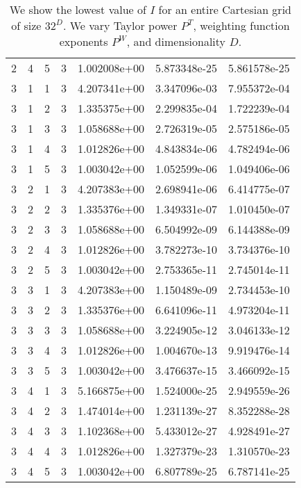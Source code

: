 \documentclass{article}
\begin{document}
\begin{small}
\begin{table}
\begin{center}
\begin{tabular}{|cccc|ccc|}
2 & 4 & 5 & 3 & 1.002008e+00 & 5.873348e-25 & 5.861578e-25 \\ 
3 & 1 & 1 & 3 & 4.207341e+00 & 3.347096e-03 & 7.955372e-04 \\ 
3 & 1 & 2 & 3 & 1.335375e+00 & 2.299835e-04 & 1.722239e-04 \\ 
3 & 1 & 3 & 3 & 1.058688e+00 & 2.726319e-05 & 2.575186e-05 \\ 
3 & 1 & 4 & 3 & 1.012826e+00 & 4.843834e-06 & 4.782494e-06 \\ 
3 & 1 & 5 & 3 & 1.003042e+00 & 1.052599e-06 & 1.049406e-06 \\ 
3 & 2 & 1 & 3 & 4.207383e+00 & 2.698941e-06 & 6.414775e-07 \\ 
3 & 2 & 2 & 3 & 1.335376e+00 & 1.349331e-07 & 1.010450e-07 \\ 
3 & 2 & 3 & 3 & 1.058688e+00 & 6.504992e-09 & 6.144388e-09 \\ 
3 & 2 & 4 & 3 & 1.012826e+00 & 3.782273e-10 & 3.734376e-10 \\ 
3 & 2 & 5 & 3 & 1.003042e+00 & 2.753365e-11 & 2.745014e-11 \\ 
3 & 3 & 1 & 3 & 4.207383e+00 & 1.150489e-09 & 2.734453e-10 \\ 
3 & 3 & 2 & 3 & 1.335376e+00 & 6.641096e-11 & 4.973204e-11 \\ 
3 & 3 & 3 & 3 & 1.058688e+00 & 3.224905e-12 & 3.046133e-12 \\ 
3 & 3 & 4 & 3 & 1.012826e+00 & 1.004670e-13 & 9.919476e-14 \\ 
3 & 3 & 5 & 3 & 1.003042e+00 & 3.476637e-15 & 3.466092e-15 \\ 
3 & 4 & 1 & 3 & 5.166875e+00 & 1.524000e-25 & 2.949559e-26 \\ 
3 & 4 & 2 & 3 & 1.474014e+00 & 1.231139e-27 & 8.352288e-28 \\ 
3 & 4 & 3 & 3 & 1.102368e+00 & 5.433012e-27 & 4.928491e-27 \\ 
3 & 4 & 4 & 3 & 1.012826e+00 & 1.327379e-23 & 1.310570e-23 \\ 
3 & 4 & 5 & 3 & 1.003042e+00 & 6.807789e-25 & 6.787141e-25 \\
\hline
\end{tabular}
\end{center}
\label{tab::worst_all_reg_inv_conv}
\caption
    {
      We show the lowest value of
      $I$ for an entire Cartesian grid of size $32^D$.
      We vary Taylor power $P^T$, weighting
      function exponents $P^W$, and dimensionality $D$. 
    }
\end{table}
\end{small}
\end{document}
